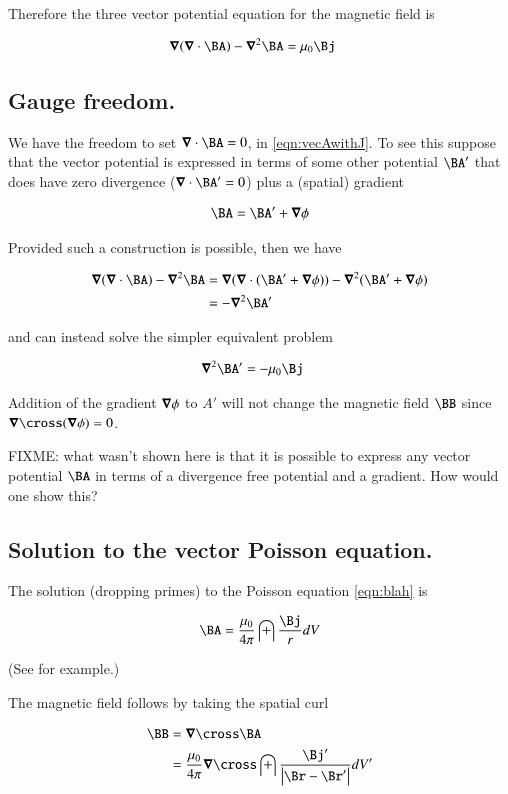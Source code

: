 \documentclass{article}
\begin{document}
Therefore the three vector potential equation for the magnetic field is

\begin{align}\label{eqn:vecAwithJ}
\spacegrad (\spacegrad \cdot \BA) - \spacegrad^2 \BA &= \mu_0 \Bj
\end{align}

\subsection{ Gauge freedom. }

We have the freedom to set $\spacegrad \cdot \BA = 0$, in \ref{eqn:vecAwithJ}.  To see this suppose that the vector potential is 
expressed in terms of some other potential $\BA'$ that does have zero divergence ($\spacegrad \cdot \BA' = 0$) plus a (spatial) gradient

\begin{align*}
\BA = \BA' + \spacegrad \phi
\end{align*}

Provided such a construction is possible, then we have

\begin{align*}
\spacegrad (\spacegrad \cdot \BA) - \spacegrad^2 \BA 
&= 
\spacegrad (\spacegrad \cdot (\BA' + \spacegrad \phi)) - \spacegrad^2 (\BA' + \spacegrad \phi) \\
&= 
- \spacegrad^2 \BA' 
\end{align*}

and can instead solve the simpler equivalent problem

\begin{align}\label{eqn:blah}
\spacegrad^2 \BA'  &= -\mu_0 \Bj
\end{align}

Addition of the gradient $\boldsymbol{\nabla} \phi$ to $A'$ will not change the magnetic field $\BB$ since $\spacegrad \cross (\spacegrad \phi) = 0$.

FIXME: what wasn't shown here is that it is possible to express any vector potential $\BA$ in terms of a divergence free potential and a 
gradient.  How would one show this?

\subsection{ Solution to the vector Poisson equation. }

The solution (dropping primes) to the Poisson equation \ref{eqn:blah} is

\begin{align*}
\BA = \frac{\mu_0}{4 \pi} \int \frac{\Bj}{r} dV
\end{align*}

(See \cite{schwartz1987pe} for example.)

The magnetic field follows by taking the spatial curl

\begin{align*}
\BB 
&= \spacegrad \cross \BA \\
&= \frac{\mu_0}{4 \pi} \spacegrad \cross \int \frac{\Bj'}{\Abs{\Br-\Br'}} dV'
\end{align*}



\end{document}

